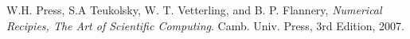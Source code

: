 \documentclass[12pt]{article}
\begin{document}
\begin{thebibliography}{9}

  W.H. Press, S.A Teukolsky, W. T. Vetterling, and B. P. Flannery,
  \emph{Numerical Recipies, The Art of Scientific Computing}.
  Camb. Univ. Press,
  3rd Edition,
  2007.

\end{thebibliography}
\end{document}
